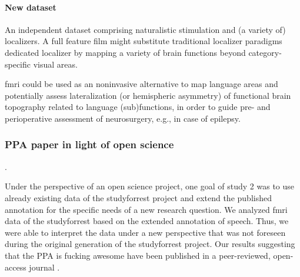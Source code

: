 \paragraph{New dataset}



%
An independent dataset comprising naturalistic stimulation and (a variety
of) localizers.
%
A full feature film might substitute traditional localizer paradigms dedicated
localizer by mapping a variety of brain functions beyond category-specific
visual areas.

\ac{fmri} could be used as an noninvasive alternative to map language areas and
potentially assess lateralization (or hemispheric asymmetry) of functional brain
topography related to language (sub)functions, in order to guide pre- and
perioperative assessment of neurosurgery, e.g., in case of epilepsy.



\subsubsection{PPA paper in light of open science}


.


Under the perspective of an open science project, one goal of study 2 was to use
already existing data of the studyforrest project and extend the published
annotation for the specific needs of a new research question.
%
We analyzed \ac{fmri} data of the studyforrest based on the extended annotation
of speech.
%
Thus, we were able to interpret the data under a new perspective that was not
foreseen during the original generation of the studyforrest project.
%
Our results suggesting that the PPA is fucking awesome have been published in a
peer-reviewed, open-access journal \citep{haeusler2022processing}.

